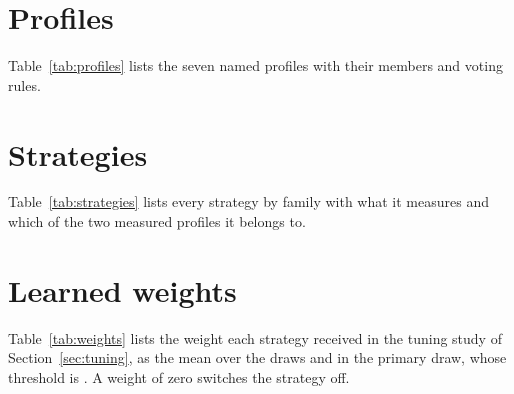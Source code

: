 \documentclass[10pt,twocolumn]{article}
\begin{document}
\section{Profiles}
\label{app:profiles}

Table~\ref{tab:profiles} lists the seven named profiles with their
members and voting rules.

\begin{table}[!t]
\centering
\small
\caption{The seven named profiles, their members and voting rules.}
\label{tab:profiles}

\end{table}

\section{Strategies}
\label{app:strategies}

Table~\ref{tab:strategies} lists every strategy by family with what it
measures and which of the two measured profiles it belongs to.



\section{Learned weights}
\label{app:weights}

Table~\ref{tab:weights} lists the weight each strategy received in the
tuning study of Section~\ref{sec:tuning}, as the mean over the
\tuningdraws{} draws and in the primary draw, whose threshold is
\tuningthreshold{}. A weight of zero switches the strategy off.

\par\medskip
\noindent\begin{minipage}{\columnwidth}
\centering
\small
{}
\label{tab:weights}

\end{minipage}
\end{document}
